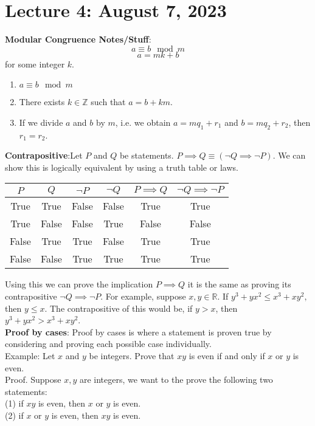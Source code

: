 \documentclass{article}
\begin{document}
\section{Lecture 4: August 7, 2023}
\textbf{Modular Congruence Notes/Stuff}:
\[a \equiv b \mod m \]
\[a = mk + b\] for some integer \(k\).\\
\begin{enumerate}
\item \(a \equiv b \mod m\)
\item There exists \(k \in \mathbb{Z}\) such that \(a=b+km\).
\item If we divide \(a\) and \(b\) by \(m\), i.e. we obtain \(a=mq_1+r_1\)
and \(b=mq_2+r_2\), then \(r_1=r_2\).
\end{enumerate}
\textbf{Contrapositive}:Let \(P\) and \(Q\) be statements. \(P \implies Q \equiv (\neg Q \implies \neg P)\). We can show this is logically equivalent by using a truth table or laws. 
\begin{center}
\begin{tabular}{|c|c|c|c|c|c|}
\hline
\(P\) & \(Q\) & \(\neg P\) & \(\neg Q\) & \(P \implies Q\) & \(\neg Q \implies \neg P\) \\
\hline
True & True & False & False & True & True \\
True & False & False & True & False & False \\
False & True & True & False & True & True \\
False & False & True & True & True & True \\
\hline
\end{tabular}
\end{center}
Using this we can prove the implication \(P \implies Q\) it is the same as proving its contrapositive \(\neg Q \implies \neg P\). For example, suppose \(x,y \in \mathbb{R}\). If \(y^3+yx^2 \leq x^3 + xy^2,\) then \(y \leq x\). The contrapositive of this would be, if \(y > x\), then \(y^3+yx^2 > x^3+xy^2\).\\
\textbf{Proof by cases}: Proof by cases is where a statement is proven true by considering and proving each possible case individually.\\
Example: Let \(x\) and \(y\) be integers. Prove that \(xy\) is even if and only if \(x\) or \(y\) is even.\\
Proof. Suppose \(x,y\) are integers, we want to the prove the following two statements:\\
(1) if \(xy\) is even, then \(x\) or \(y\) is even.\\
(2) if \(x\) or \(y\) is even, then \(xy\) is even.\\
\end{document}
